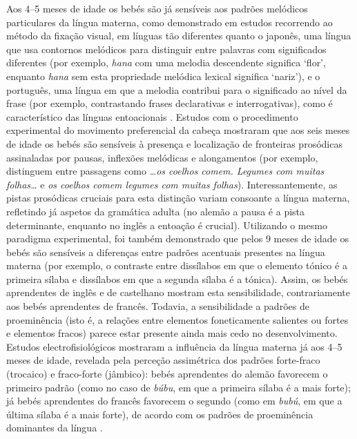 \documentclass[output=paper]{LSP/langsci}
\begin{document}
Aos 4--5 meses de idade os bebés são já sensíveis aos padrões melódicos particulares da língua materna, como demonstrado em estudos recorrendo ao método da fixação visual, em línguas tão diferentes quanto o japonês, uma língua que usa contornos melódicos para distinguir entre palavras com significados diferentes (por exemplo, \textit{hana} com uma melodia descendente significa `flor', enquanto \textit{hana} sem esta propriedade melódica lexical significa `nariz'), e o português, uma língua em que a melodia contribui para o significado ao nível da frase (por exemplo, contrastando frases declarativas e interrogativas), como é característico das línguas entoacionais \citep{frota_etal2014}. Estudos com o procedimento experimental do movimento preferencial da cabeça mostraram que aos seis meses de idade os bebés são sensíveis à presença e localização de fronteiras prosódicas assinaladas por pausas, inflexões melódicas e alongamentos (por exemplo, distinguem entre passagens como \textit{\ldots os coelhos comem. Legumes com muitas folhas\ldots} e \textit{os coelhos comem legumes com muitas folhas}). Interessantemente, as pistas prosódicas cruciais para esta distinção variam consoante a língua materna, refletindo já aspetos da gramática adulta (no alemão a pausa é a pista determinante, enquanto no inglês a entoação é crucial). Utilizando o mesmo paradigma experimental, foi também demonstrado que pelos 9 meses de idade os bebés são sensíveis a diferenças entre padrões acentuais presentes na língua materna (por exemplo, o contraste entre dissílabos em que o elemento tónico é a primeira sílaba e dissílabos em que a segunda sílaba é a tónica). Assim, os bebés aprendentes de inglês e de castelhano mostram esta sensibilidade, contrariamente aos bebés aprendentes de francês. Todavia, a sensibilidade a padrões de proeminência (isto é, a relações entre elementos foneticamente salientes ou fortes e elementos fracos) parece estar presente ainda mais cedo no desenvolvimento. Estudos electrofisiológicos mostraram a influência da língua materna já aos 4--5 meses de idade, revelada pela perceção assimétrica dos padrões forte-fraco (trocaico) e fraco-forte (jâmbico): bebés aprendentes do alemão favorecem o primeiro padrão (como no caso de \textit{búbu}, em que a primeira sílaba é a mais forte); já bebés aprendentes do francês favorecem o segundo (como em \textit{bubú}, em que a última sílaba é a mais forte), de acordo com os padrões de proeminência dominantes da língua \citep{gerkenaslin2005,seidlcristia2008,skoruppa2013development}.
\end{document}
